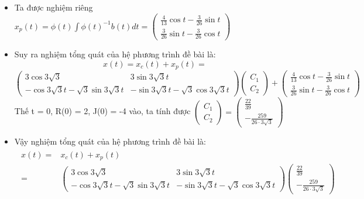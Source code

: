 \documentclass[a4paper]{article}
\begin{document}
\begin{enumerate}
\begin{itemize}
    \item Ta được nghiệm riêng $x_p(t) = \phi(t)\int\phi(t)^{-1}b(t)dt = \left( \begin{matrix} \frac{4}{13}\cos{t}-\frac{3}{26}\sin{t} \\[4pt] \frac{3}{26}\sin{t}-\frac{3}{26}\cos{t} \end{matrix} \right)$
    \item Suy ra nghiệm tổng quát của hệ phương trình đề bài là:
        $$x(t) = x_c(t) + x_p(t) = $$
        \begin{equation*}
            \left( \begin{matrix} 3\cos{3\sqrt{3}} & 3\sin{3\sqrt{3}t} \\ -\cos{3\sqrt{3}t} - \sqrt{3}\sin{3\sqrt{3}t} & -\sin{3\sqrt{3}t} - \sqrt{3}\cos{3\sqrt{3}t} \end{matrix} \right)\left( \begin{matrix} C_1 \\ C_2 \end{matrix} \right)
            + \left( \begin{matrix} \frac{4}{13}\cos{t}-\frac{3}{26}\sin{t} \\[4pt] \frac{3}{26}\sin{t}-\frac{3}{26}\cos{t} \end{matrix} \right)
        \end{equation*}
        Thế t = 0, R(0) = 2, J(0) = -4 vào, ta tính được $\begin{pmatrix} C_1 \\ C_2 \end{pmatrix} = \begin{pmatrix} \frac{22}{39} \\[3pt] -\frac{259}{26\cdot3\sqrt{3}} \end{pmatrix}$ 
    \item Vậy nghiệm tổng quát của hệ phương trình đề bài là: 
        \begin{align*}
            \begin{split}
                x(t) =& x_c(t) + x_p(t) \\
                =& \left( \begin{matrix} 3\cos{3\sqrt{3}} & 3\sin{3\sqrt{3}t} \\ -\cos{3\sqrt{3}t} - \sqrt{3}\sin{3\sqrt{3}t} & -\sin{3\sqrt{3}t} - \sqrt{3}\cos{3\sqrt{3}t} \end{matrix} \right)\begin{pmatrix} \frac{22}{39} \\[3pt] -\frac{259}{26\cdot3\sqrt{3}} \end{pmatrix} \\  

\end{split}
\end{align*}
\end{itemize}
\end{enumerate}
\end{document}
